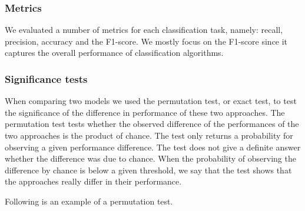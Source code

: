 
\subsubsection{Metrics}
We evaluated a number of metrics for each classification task, namely: 
recall, precision, accuracy and the F1-score. We mostly focus on the F1-score since it captures the overall performance of classification algorithms.

\subsubsection{Significance tests}
When comparing two models we used the permutation test, or exact test, to test the significance of the difference in performance of these two approaches.
The permutation test tests whether the observed difference of the performances of the two approaches is the product of chance.
The test only returns a probability for observing a given performance difference. The test does not give a definite answer whether the difference was due to chance.
When the probability of observing the difference by chance is below a given threshold, we say that the test shows that the approaches really differ in their performance.

Following is an example of a permutation test.


